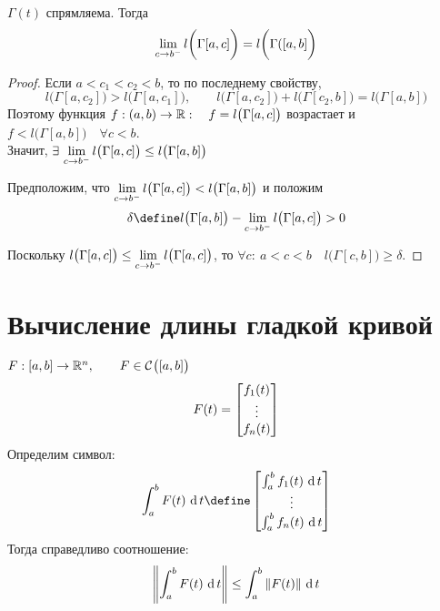 \begin{property}
	$ \Gamma(t) $ спрямляема. Тогда
	$$ \liml{c \to b^-} l \bigg( \Gamma[a, c] \bigg) = l \bigg( \Gamma([a, b] \bigg) $$
\end{property}

\begin{proof}
	Если $ a < c_1 < c_2 < b $, то по последнему свойству,
	$$ l \big( \Gamma[a, c_2] \big) > l \big( \Gamma[a, c_1] \big), \qquad l \big( \Gamma[a, c_2] \big) + l \big( \Gamma[c_2, b] \big) = l \big( \Gamma[a, b] \big) $$
	Поэтому функция $ f : (a, b) \to \R : \quad f = l \big( \Gamma[a, c] \big) $ возрастает и $ f < l \big( \Gamma[a, b] \big) \quad \forall c < b $. \\
	Значит, $ \exist \liml{c \to b^-} l \big( \Gamma[a, c] \big) \le l \big( \Gamma[a, b] \big) $

	Предположим, что $ \liml{c \to b^-} l \big( \Gamma[a, c] \big) < l \big( \Gamma[a, b] \big) $ и положим
	$$ \delta \define l \big( \Gamma[a, b] \big) - \liml{c \to b^-} l \big( \Gamma[a, c] \big) > 0 $$

	Поскольку $ l \big( \Gamma[a, c] \big) \le \liml{c \to b^-} l \big( \Gamma[a, c] \big) $, то $ \forall c : ~ a < c < b \quad l \big( \Gamma[c, b] \big) \ge \delta $.
\end{proof}

\section{Вычисление длины гладкой кривой}

\begin{lemma}
	$ F : [a, b] \to \R^n, \qquad F \in \Cont{[a, b]} $
	$$ F(t) = \column{f_1(t)}{f_n(t)} $$
	Определим символ:
	$$ \dint[t]ab{F(t)} \define \column{\dint[t]ab{f_1(t)}}{\dint[t]ab{f_n(t)}} $$
	Тогда справедливо соотношение:
	$$ \norm{\dint[t]ab{F(t)}} \le \dint[t]ab{\norm{F(t)}} $$
\end{lemma}


